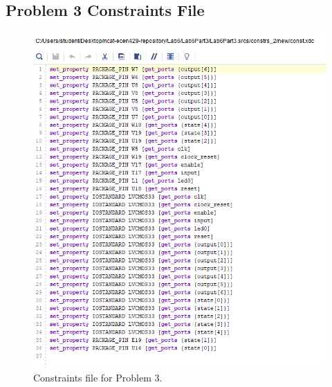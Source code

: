 \documentclass[11pt]{article}
\begin{document}
\begin{appendices}
\section{Problem 3 Constraints File}
\begin{center}
\begin{figure}
	\includegraphics[scale=1]{./images/Lab6Part3Const.png}
	\caption{\label{fig:Prob1Const}Constraints file for Problem 3.}
\end{figure}
\end{center}

\end{appendices}
\end{document}
